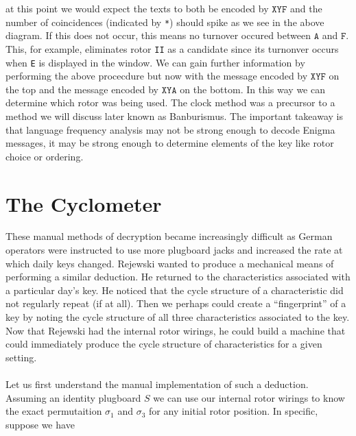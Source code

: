 at this point we would expect the texts to both be encoded by $\texttt{XYF}$ and the number of coincidences (indicated by \texttt{*}) should spike as we see in the above diagram. If this does not occur, this means no turnover occured between $\texttt{A}$ and $\texttt{F}$. This, for example, eliminates rotor \texttt{II} as a candidate since its turnonver occurs when \texttt{E} is displayed in the window. We can gain further information by performing the above procecdure but now with the message encoded by $\texttt{XYF}$ on the top and the message encoded by $\texttt{XYA}$ on the bottom. In this way we can determine which rotor was being used. The clock method was a precursor to a method we will discuss later known as Banburismus. The important takeaway is that language frequency analysis may not be strong enough to decode Enigma messages, it may be strong enough to determine elements of the key like rotor choice or ordering.

\section{The Cyclometer}

These manual methods of decryption became increasingly difficult as German operators were instructed to use more plugboard jacks and increased the rate at which daily keys changed. Rejewski wanted to produce a mechanical means of performing a similar deduction. He returned to the characteristics associated with a particular day's key. He noticed that the cycle structure of a characteristic did not regularly repeat (if at all). Then we perhaps could create a ``fingerprint'' of a key by noting the cycle structure of all three characteristics associated to the key. Now that Rejewski had the internal rotor wirings, he could build a machine that could immediately produce the cycle structure of characteristics for a given setting.
\\\\Let us first understand the manual implementation of such a deduction. Assuming an identity plugboard $S$ we can use our internal rotor wirings to know the exact permutaition $\sigma_1$ and $\sigma_3$ for any initial rotor position. In specific, suppose we have

